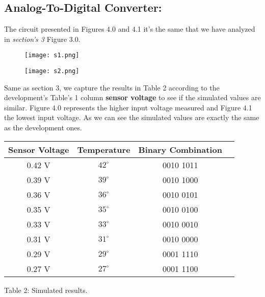 \subsection{Analog-To-Digital Converter:}

The circuit presented in Figures 4.0 and 4.1 it's the same that we have analyzed in {\itshape section's 3} Figure 3.0.

\begin{figure}[H]
\texttt{[image: s1.png]}
\centering \linebreak {}
\end{figure}

\begin{figure}[H]
\texttt{[image: s2.png]}
\centering \linebreak {}
\end{figure}

\pagebreak

Same as section 3, we capture the results in Table 2 according to the development's Table's 1 column {\bfseries sensor voltage} to see if the simulated values are similar. Figure 4.0 represents the higher input voltage measured and Figure 4.1 the lowest input voltage. As we can see the simulated values are exactly the same as the development ones. \hfill \break

\begin{center}
\begin{tabular}{c c c c}
\toprule \toprule
\hspace{40px} Sensor Voltage \hspace{40px} & \hspace{30px} Temperature \hspace{30px} & \hspace{30px} Binary Combination \hspace{30px} \\
\midrule \midrule
0.42 V & $42^{\circ}$ & 0010 1011 & \\
\midrule
0.39 V & $39^{\circ}$ & 0010 1000 & \\
\midrule
0.36 V & $36^{\circ}$ & 0010 0101 & \\
\midrule
0.35 V & $35^{\circ}$ & 0010 0100 & \\
\midrule
0.33 V & $33^{\circ}$ & 0010 0010 & \\
\midrule
0.31 V & $31^{\circ}$ & 0010 0000 & \\
\midrule
0.29 V & $29^{\circ}$ & 0001 1110 & \\
\midrule
0.27 V & $27^{\circ}$ & 0001 1100 & \\
\bottomrule
\end{tabular}
\centering \linebreak \linebreak Table 2: Simulated results.
\end{center}

\pagebreak